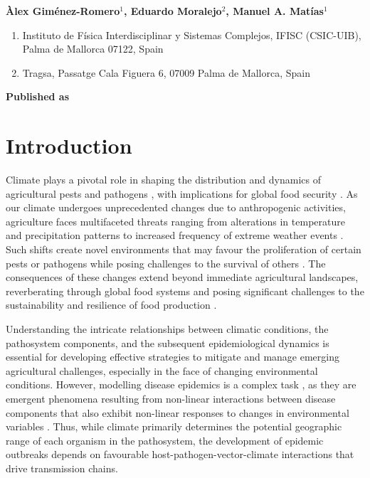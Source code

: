 \vspace{1cm}

\textbf{Àlex Giménez-Romero$^{1}$, Eduardo Moralejo$^{2}$, Manuel A.
    Matías$^{1}$}

\vspace{1cm}

\begin{enumerate}
    \small
    \item Instituto de Física Interdisciplinar y Sistemas Complejos, IFISC
          (CSIC-UIB), Palma de Mallorca 07122, Spain
    \item Tragsa, Passatge Cala Figuera 6, 07009 Palma de Mallorca, Spain
\end{enumerate}

\vspace{1cm}

\textbf{Published as}

\vspace{0.5cm}


\newpage
\section{Introduction}

Climate plays a pivotal role in shaping the distribution and dynamics of
agricultural pests and pathogens
\cite{Harvell2002,Lafferty2009,Bebber2013,Bebber2014,Delgado-Baquerizo2020},
with implications for global food security \cite{Fones2020, Ristaino}. As our
climate undergoes unprecedented changes due to anthropogenic activities,
agriculture faces multifaceted threats ranging from alterations in temperature
and precipitation patterns to increased frequency of extreme weather events
\cite{skendzic2021impact}. Such shifts create novel environments that may
favour the proliferation of certain pests or pathogens while posing challenges
to the survival of others \cite{Bebber2013, Dudney2021}. The consequences of
these changes extend beyond immediate agricultural landscapes, reverberating
through global food systems and posing significant challenges to the
sustainability and resilience of food production \cite{Ortiz-Bobea2021}.

Understanding the intricate relationships between climatic conditions, the
pathosystem components, and the subsequent epidemiological dynamics is
essential for developing effective strategies to mitigate and manage emerging
agricultural challenges, especially in the face of changing environmental
conditions. However, modelling disease epidemics is a complex task , as they
are emergent phenomena resulting from non-linear interactions between disease
components that also exhibit non-linear responses to changes in environmental
variables \cite{scherm1994global,garrett2011complexity,jeger2019epidemiology}.
Thus, while climate primarily determines the potential geographic range of each
organism in the pathosystem, the development of epidemic outbreaks depends on
favourable host-pathogen-vector-climate interactions that drive transmission
chains.


